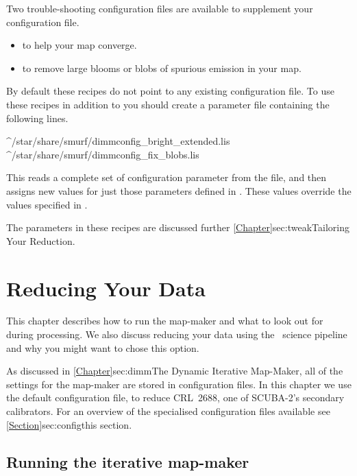 \documentclass[11pt,oneside,chapters]{starlink}
\begin{document}
Two trouble-shooting configuration files are available to supplement your
configuration file.
\begin{itemize}[noitemsep]
\item {} to help your map converge.
\item {} to remove large blooms or blobs of spurious
emission in your map.
\end{itemize}
By default these recipes do not point to any existing configuration file. To use
these recipes in addition to   you should
create a parameter file containing the following lines.

\begin{terminalv}
^/star/share/smurf/dimmconfig_bright_extended.lis
^/star/share/smurf/dimmconfig_fix_blobs.lis
\end{terminalv}

This reads a complete set of configuration parameter from the
 file, and then assigns new values for just
those parameters defined in . These values override
the values specified in .

The parameters in these recipes are discussed further
\cref{Chapter}{sec:tweak}{Tailoring Your Reduction}.



\chapter{Reducing Your Data}
\label{sec:maps}

This chapter describes how to run the map-maker and what to look out
for during processing. We also discuss reducing your data using the
\oracdr\ science pipeline and why you might want to chose this option.

As discussed in \cref{Chapter}{sec:dimm}{The
Dynamic Iterative Map-Maker}, all of the settings for the map-maker
are stored in configuration files. In this chapter we use
the default configuration file,  to reduce CRL~2688,
one of SCUBA-2's secondary calibrators. For an
overview of the specialised configuration files available see
\cref{Section}{sec:config}{this section}.

\section{Running the iterative map-maker}
\label{sec:running}
\end{document}
